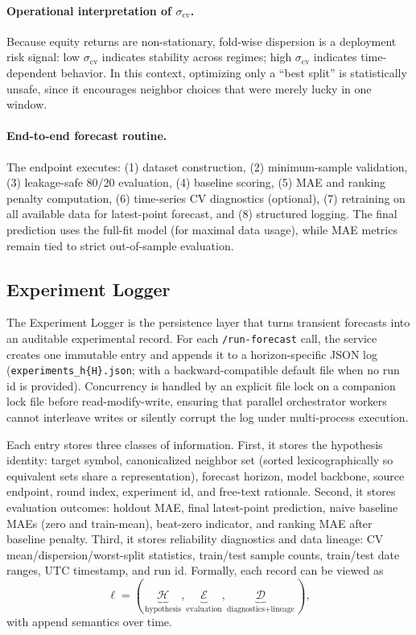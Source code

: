 \documentclass[12pt,a4paper,titlepage]{article}
\begin{document}
\paragraph{Operational interpretation of \(\sigma_{\text{cv}}\).}
Because equity returns are non-stationary, fold-wise dispersion is a deployment risk signal: low \(\sigma_{\text{cv}}\) indicates stability across regimes; high \(\sigma_{\text{cv}}\) indicates time-dependent behavior. In this context, optimizing only a ``best split'' is statistically unsafe, since it encourages neighbor choices that were merely lucky in one window.

\paragraph{End-to-end forecast routine.}
The endpoint executes: (1) dataset construction, (2) minimum-sample validation, (3) leakage-safe 80/20 evaluation, (4) baseline scoring, (5) MAE and ranking penalty computation, (6) time-series CV diagnostics (optional), (7) retraining on all available data for latest-point forecast, and (8) structured logging. The final prediction uses the full-fit model (for maximal data usage), while MAE metrics remain tied to strict out-of-sample evaluation.

\subsection{Experiment Logger}

The Experiment Logger is the persistence layer that turns transient forecasts into an auditable experimental record. For each \texttt{/run-forecast} call, the service creates one immutable entry and appends it to a horizon-specific JSON log (\texttt{experiments\_h\{H\}.json}; with a backward-compatible default file when no run id is provided). Concurrency is handled by an explicit file lock on a companion lock file before read-modify-write, ensuring that parallel orchestrator workers cannot interleave writes or silently corrupt the log under multi-process execution.

Each entry stores three classes of information. First, it stores the hypothesis identity: target symbol, canonicalized neighbor set (sorted lexicographically so equivalent sets share a representation), forecast horizon, model backbone, source endpoint, round index, experiment id, and free-text rationale. Second, it stores evaluation outcomes: holdout MAE, final latest-point prediction, naive baseline MAEs (zero and train-mean), beat-zero indicator, and ranking MAE after baseline penalty. Third, it stores reliability diagnostics and data lineage: CV mean/dispersion/worst-split statistics, train/test sample counts, train/test date ranges, UTC timestamp, and run id. Formally, each record can be viewed as
\[
\ell = (\,\underbrace{\mathcal{H}}_{\text{hypothesis}},\underbrace{\mathcal{E}}_{\text{evaluation}},\underbrace{\mathcal{D}}_{\text{diagnostics+lineage}}\,),
\]
with append semantics over time.
\end{document}
